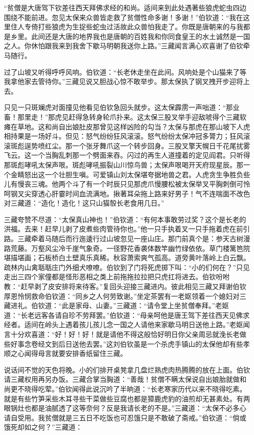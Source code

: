 \documentclass[12pt,UTF8]{ctexbook}
\begin{document}
{“贫僧是大唐驾下钦差往西天拜佛求经的和尚。适间来到此处遇著些狼虎蛇虫四边围绕不能前进。忽见太保来众兽皆走救了贫僧性命多谢！多谢！”伯钦道：“我在这里住人专倚打些狼虎为生捉些蛇虫过活故此众兽怕我走了。你既是唐朝来的与我都是乡里。此间还是大唐的地界我也是唐朝的百姓我和你同食皇王的水土诚然是一国之人。你休怕跟我来到我舍下歇马明朝我送你上路。”三藏闻言满心欢喜谢了伯钦牵马随行。

过了山坡又听得呼呼风响。伯钦道：“长老休走坐在此间。风响处是个山猫来了等我拿他家去管待你。”三藏见说又胆战心惊不敢举步。那太保执了钢叉拽开步迎将上去。

只见一只斑斓虎对面撞见他看见伯钦急回头就步。这太保霹雳一声咄道：“那业畜！那里走！”那虎见赶得急转身轮爪扑来。这太保三股叉举手迎敌唬得个三藏软瘫在草地。这和尚自出娘肚皮那曾见这样凶险的勾当？太保与那虎在那山坡下人虎相持果是一场好斗。但见：怒气纷纷狂风滚滚。怒气纷纷太保冲冠多膂力；狂风滚滚斑彪逞势喷红尘。那一个张牙舞爪这一个转步回身。三股叉擎天幌日千花尾扰雾飞云。这一个当胸乱刺那一个劈面来吞。闪过的再生人道撞着的定见阎君。只听得那斑彪哮吼太保声哏。斑彪哮吼振裂山川惊鸟兽；太保声哏喝开天府现星辰。那一个金睛怒出这一个壮胆生嗔。可爱镇山刘太保堪夸据地兽之君。人虎贪生争胜负些儿有慢丧三魂。他两个斗了有一个时辰只见那虎爪慢腰松被太保举叉平胸刺倒可怜呵钢叉尖穿透心肝霎时间血流满地。揪著耳朵拖上路来好男子！气不连喘面不改色对三藏道：“造化！造化！这只山猫彀长老食用几日。”

三藏夸赞不尽道：“太保真山神也！”伯钦道：“有何本事敢劳过奖？这个是长老的洪福。去来！赶早儿剥了皮煮些肉管待你也。”他一只手执着叉一只手拖着虎在前引路。三藏牵着马随后而行迤逶行过山坡忽见一座山庄。那门前真个是：参天古树漫路荒藤。万壑风尘冷千崖气象奇。一径野花香袭体数竿幽竹绿依依。草门楼篱笆院堪描堪画；石板桥白土壁真乐真稀。秋容萧索爽气孤高。道旁黄叶落岭上白云飘。疏林内山禽聒聒庄门外细犬嘹嘹。伯钦到了门将死虎掷下叫：“小的们何在？”只见走出三四个家僮都是怪形恶相之类上前拖拖拉拉把只虎扛将进去。伯钦吩咐教：“赶早剥了皮安排将来待客。”复回头迎接三藏进内。彼此相见三藏又拜谢伯钦厚恩怜悯救命伯钦道：“同乡之人何劳致谢。”坐定茶罢有一老妪领着一个媳妇对三藏进礼。伯钦道：“此是家母、山妻。”三藏道：“请令堂上坐贫僧奉拜。”老妪道：“长老远客各请自珍不劳拜罢。”伯钦道：“母亲呵他是唐王驾下差往西天见佛求经者。适间在岭头上遇着孩儿孩儿念一国之人请他来家歇马明日送他上路。”老妪闻言十分欢喜道：“好！好！好！就是请他不得这般恰好明日你父亲周忌就浼长老做些好事念卷经文到后日送他去罢。”这刘伯钦虽是一个杀虎手镇山的太保他却有些孝顺之心闻得母言就要安排香纸留住三藏。

说话间不觉的天色将晚。小的们排开桌凳拿几盘烂熟虎肉热腾腾的放在上面。伯钦请三藏权用再另办饭。三藏合掌当胸道：“善哉！贫僧不瞒太保说自出娘胎就做和尚更不晓得吃荤。”伯钦闻得此说沉吟了半晌道：“长老寒家历代以来不晓得吃素。就是有些竹笋采些木耳寻些干菜做些豆腐也都是獐鹿虎豹的油煎却无甚素处。有两眼锅灶也都是油腻透了这等奈何？反是我请长老的不是。”三藏道：“太保不必多心请自受用。我贫僧就是三五日不吃饭也可忍饿只是不敢破了斋戒。”伯钦道：“倘或饿死却如之何？”三藏道：

}
\end{document}
